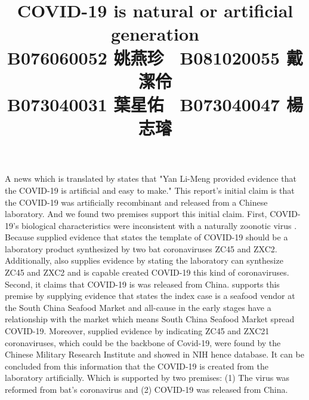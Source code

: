 \documentclass[a4paper, 12pt]{article}
\title{COVID-19 is natural or artificial generation\\
\small
B076060052 姚燕珍 \ B081020055 戴潔伶\\
B073040031 葉星佑 \ B073040047 楊志璿
}
\date{}
\begin{document}
\begin{CJK*}{UTF8}{bsmi}
    \maketitle

    A news which is translated by \textcite{202009150112} states that "Yan Li-Meng
    provided evidence that the COVID-19 is artificial and easy to make."
    This report's initial claim is that the COVID-19 was artificially recombinant 
    and released from a Chinese laboratory. And we found two premises support this
    initial claim. First, COVID-19's biological characteristics were inconsistent 
    with a naturally zoonotic virus \textcite{202009150112}. Because 
    \textcite{yan_li_meng_2020_4028830} supplied evidence that states the template
    of COVID-19 should be a laboratory product synthesized by two bat coronaviruses 
    ZC45 and ZXC2. Additionally, \textcite{202008140064} also supplies evidence by
    stating the laboratory can synthesize ZC45 and ZXC2 and is capable created 
    COVID-19 this kind of coronaviruses. 
    Second, it claims that COVID-19 is was released from China. \textcite{20211119}
    supports this premise by supplying evidence that states the index case is a 
    seafood vendor at the South China Seafood Market and all-cause in the early 
    stages have a relationship with the market which means South China Seafood Market
    spread COVID-19. Moreover, \textcite{202008140064} supplied evidence by indicating
    ZC45 and ZXC21 coronaviruses, which could be the backbone of Covid-19, were found
    by the Chinese Military Research Institute and showed in NIH hence database. 
    It can be concluded from this information that the COVID-19 is created from the 
    laboratory artificially. Which is supported by two premises: (1) The virus was
    reformed from bat's coronavirus and (2) COVID-19 was released from China.\\


\end{CJK*}
\end{document}
